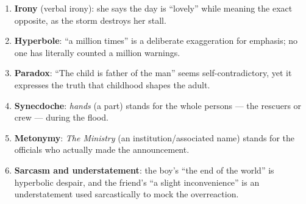 \documentclass[11pt]{article}
\begin{document}
\begin{corrige}
\begin{enumerate}
\item \textbf{Irony} (verbal irony): she says the day is ``lovely'' while meaning the exact opposite, as the storm destroys her stall.
\item \textbf{Hyperbole}: ``a million times'' is a deliberate exaggeration for emphasis; no one has literally counted a million warnings.
\item \textbf{Paradox}: ``The child is father of the man'' seems self-contradictory, yet it expresses the truth that childhood shapes the adult.
\item \textbf{Synecdoche}: \emph{hands} (a part) stands for the whole persons — the rescuers or crew — during the flood.
\item \textbf{Metonymy}: \emph{The Ministry} (an institution/associated name) stands for the officials who actually made the announcement.
\item \textbf{Sarcasm and understatement}: the boy's ``the end of the world'' is hyperbolic despair, and the friend's ``a slight inconvenience'' is an understatement used sarcastically to mock the overreaction.
\end{enumerate}
\end{corrige}
\end{document}
